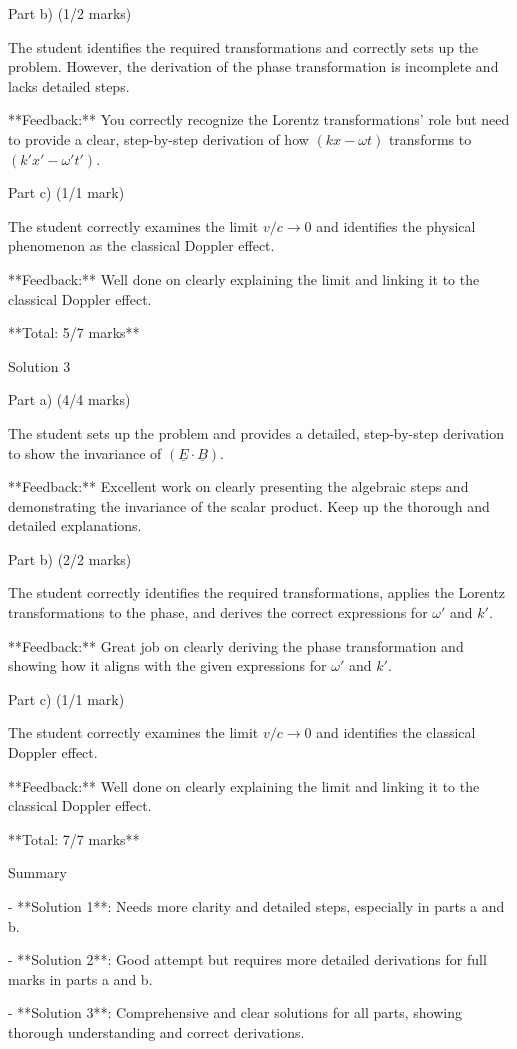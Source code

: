 \documentclass[a4paper,11pt]{article}
\begin{document}
Part b) (1/2 marks)

The student identifies the required transformations and correctly sets up the problem. However, the derivation of the phase transformation is incomplete and lacks detailed steps.

**Feedback:** You correctly recognize the Lorentz transformations' role but need to provide a clear, step-by-step derivation of how \( (kx - \omega t) \) transforms to \( (k'x' - \omega' t') \).

Part c) (1/1 mark)

The student correctly examines the limit \(v/c \rightarrow 0\) and identifies the physical phenomenon as the classical Doppler effect.

**Feedback:** Well done on clearly explaining the limit and linking it to the classical Doppler effect.

**Total: 5/7 marks**

Solution 3

Part a) (4/4 marks)

The student sets up the problem and provides a detailed, step-by-step derivation to show the invariance of \((\underline{E} \cdot \underline{B})\).

**Feedback:** Excellent work on clearly presenting the algebraic steps and demonstrating the invariance of the scalar product. Keep up the thorough and detailed explanations.

Part b) (2/2 marks)

The student correctly identifies the required transformations, applies the Lorentz transformations to the phase, and derives the correct expressions for \(\omega'\) and \(k'\).

**Feedback:** Great job on clearly deriving the phase transformation and showing how it aligns with the given expressions for \(\omega'\) and \(k'\).

Part c) (1/1 mark)

The student correctly examines the limit \(v/c \rightarrow 0\) and identifies the classical Doppler effect.

**Feedback:** Well done on clearly explaining the limit and linking it to the classical Doppler effect.

**Total: 7/7 marks**

Summary

- **Solution 1**: Needs more clarity and detailed steps, especially in parts a and b.

- **Solution 2**: Good attempt but requires more detailed derivations for full marks in parts a and b.

- **Solution 3**: Comprehensive and clear solutions for all parts, showing thorough understanding and correct derivations.
\end{document}
